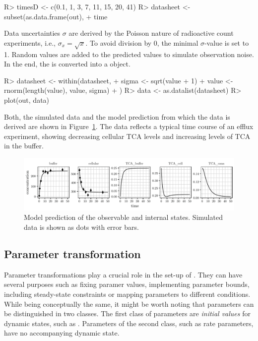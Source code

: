 \documentclass[article]{jss}
\begin{document}
\begin{CodeChunk}
\begin{CodeInput}
R> timesD <- c(0.1, 1, 3, 7, 11, 15, 20, 41)
R> datasheet <- subset(as.data.frame(out),
+    time %
\end{CodeInput}
\end{CodeChunk}
%
Data uncertainties $\sigma$ are derived by the Poisson nature of radioactive count experiments, i.e., $\sigma_x = \sqrt{x}$. To avoid division by 0, the minimal $\sigma$-value is set to 1. Random values are added to the predicted values to simulate observation noise. In the end, the  is converted into a  object.
%
\begin{CodeChunk}
\begin{CodeInput}
R> datasheet <- within(datasheet, {
+    sigma <- sqrt(value + 1)
+    value <- rnorm(length(value), value, sigma)
+  })
R> data <- as.datalist(datasheet)
R> plot(out, data)
\end{CodeInput}
\end{CodeChunk}
%
Both, the simulated data and the model prediction from which the data is derived are shown in Figure~\ref{fig:observation}. The data reflects a typical time course of an efflux experiment, showing decreasing cellular TCA levels and increasing levels of TCA in the buffer.
%
\begin{figure}[t!]
\centering
\includegraphics[width = \textwidth]{Figures/figure2}
\caption{Model prediction of the observable and internal states. Simulated data is shown as dots with error bars.\label{fig:observation}}
\end{figure}

\subsection{Parameter transformation}
Parameter transformations play a crucial role in the set-up of . They can have several purposes such as fixing paramer values, implementing parameter bounds, including steady-state constraints or mapping parameters to different conditions. While being conceptually the same, it might be worth noting that parameters can be distinguished in two classes. The first class of parameters are \textit{initial values} for dynamic states, such as . Parameters of the second class, such as rate parameters, have no accompanying dynamic state.
\end{document}
